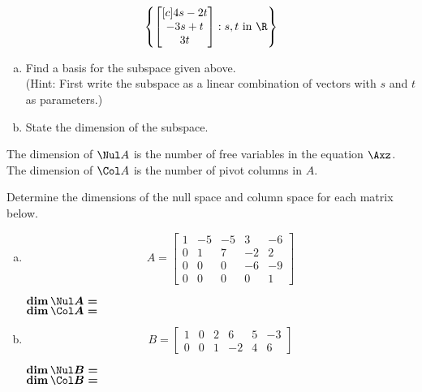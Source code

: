 \begin{exercise} %
	$$\left\{ \begin{bmatrix}[c] 4s - 2t \\ -3s + t \\ 3t \end{bmatrix} : s,t \text{ in } \R \right\}$$
	\begin{enumerate}[(a)]
		\item Find a basis for the subspace given above. \\
		(Hint: First write the subspace as a linear combination of vectors with $s$ and $t$ as parameters.)
		\vfill
		\item State the dimension of the subspace.
		\vspace{2em}
	\end{enumerate}
\end{exercise}


\begin{boxme}
	The dimension of $\Nul A$ is the number of free variables in the equation $\Axz$. \\
	The dimension of $\Col A$ is the number of pivot columns in $A$.
\end{boxme}


\begin{exercise} %
	Determine the dimensions of the null space and column space for each matrix below.
	\begin{multicols}{2}
	\begin{enumerate}[(a)]
		\item $$A=\begin{bmatrix}1&-5&-5&3&-6\\0&1&7&-2&2\\0&0&0&-6&-9\\0&0&0&0&1\end{bmatrix}$$
		\vspace{2em}
		
		$\boldsymbol{\dim\Nul A=}$ \\[1em]
		$\boldsymbol{\dim\Col A=}$
		
		\columnbreak
		
		\item $$B=\begin{bmatrix}1&0&2&6&5&-3\\0&0&1&-2&4&6\end{bmatrix}$$
		\vspace{2em}
		
		$\boldsymbol{\dim\Nul B=}$ \\[1em]
		$\boldsymbol{\dim\Col B=}$
	\end{enumerate}
	\end{multicols}
\end{exercise}
\vspace{1in}


